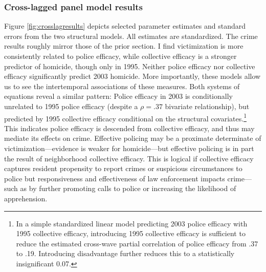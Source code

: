 \documentclass [11pt, proquest] {uwthesis}[2015/03/03]
\begin{document}
\hypertarget{cross-lagged-panel-model-results}{%
\subsubsection{Cross-lagged panel model results}\label{cross-lagged-panel-model-results}}

Figure \ref{fig:crosslagresults} depicts selected parameter estimates and standard errors from the two structural models. All estimates are standardized. The crime results roughly mirror those of the prior section. I find victimization is more consistently related to police efficacy, while collective efficacy is a stronger predictor of homicide, though only in 1995. Neither police efficacy nor collective efficacy significantly predict 2003 homicide. More importantly, these models allow us to see the intertemporal associations of these measures. Both systems of equations reveal a similar pattern: Police efficacy in 2003 is conditionally unrelated to 1995 police efficacy (despite a \(\rho = .37\) bivariate relationship), but predicted by 1995 collective efficacy conditional on the structural covariates.\footnote{In a simple standardized linear model predicting 2003 police efficacy with 1995 collective efficacy, introducing 1995 collective efficacy is sufficient to reduce the estimated cross-wave partial correlation of police efficacy from .37 to .19. Introducing disadvantage further reduces this to a statistically insignificant 0.07.} This indicates police efficacy is descended from collective efficacy, and thus may mediate its effects on crime. Effective policing may be a proximate determinate of victimization---evidence is weaker for homicide---but effective policing is in part the result of neighborhood collective efficacy. This is logical if collective efficacy captures resident propensity to report crimes or suspicious circumstances to police but responsiveness and effectiveness of law enforcement impacts crime---such as by further promoting calls to police or increasing the likelihood of apprehension.\linebreak
\linebreak
\end{document}
